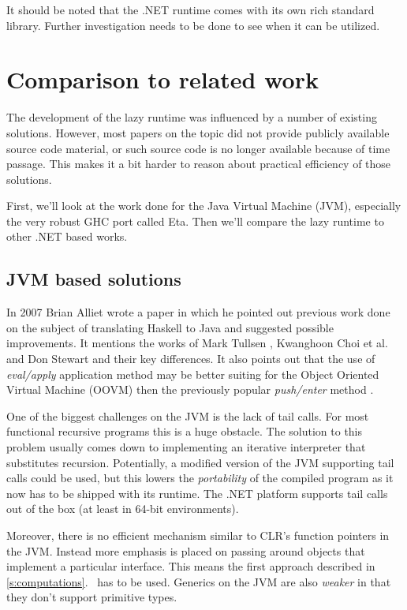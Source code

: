 \documentclass[en]{pracamgr}
\newcommand{\myref}[1]{\ref{#1}.~\textit{\nameref{#1}}}
\begin{document}
It should be noted that the .NET runtime comes with its own
rich standard library. Further investigation needs to be done
to see when it can be utilized.

\chapter{Comparison to related work}\label{r:alternatives}

The development of the lazy runtime was influenced by a
number of existing solutions. However, most papers on the
topic did not provide publicly available source code
material, or such source code is no longer available because
of time passage. This makes it a bit harder
to reason about practical efficiency of those solutions.

First, we'll look at the work done for the Java Virtual Machine (JVM),
especially the very robust GHC port called Eta.
Then we'll compare the lazy runtime to other .NET based works.

\section{JVM based solutions}

In 2007 Brian Alliet wrote a paper \cite{Alliet} in which
he pointed out previous work done on the subject of
translating Haskell to Java and suggested possible improvements.
It mentions the works of Mark Tullsen \cite{Tullsen},
Kwanghoon Choi et al. \cite{Choi}
and Don Stewart \cite{Stewart} and their key differences.
It also points out that the use of \textit{eval/apply} application method
may be better suiting for the Object Oriented Virtual Machine (OOVM)
then the previously popular \textit{push/enter} method
\cite{fastcurry}.

One of the biggest challenges on the JVM is the lack of
tail calls. For most functional recursive programs this
is a huge obstacle. The solution to this problem
usually comes down to implementing an iterative interpreter
that substitutes recursion.
Potentially, a modified version of the JVM supporting tail calls
could be used, but this lowers the \textit{portability} of the
compiled program as it now has to be shipped with its runtime.
The .NET platform supports tail calls out of the box
(at least in 64-bit environments).

Moreover, there is no efficient mechanism similar
to CLR's function pointers in the JVM.
Instead more emphasis is placed on passing around objects
that implement a particular interface.
This means the first approach described in \myref{s:computations}
has to be used.
Generics on the JVM are also \textit{weaker} in that they don't
support primitive types.
\end{document}
